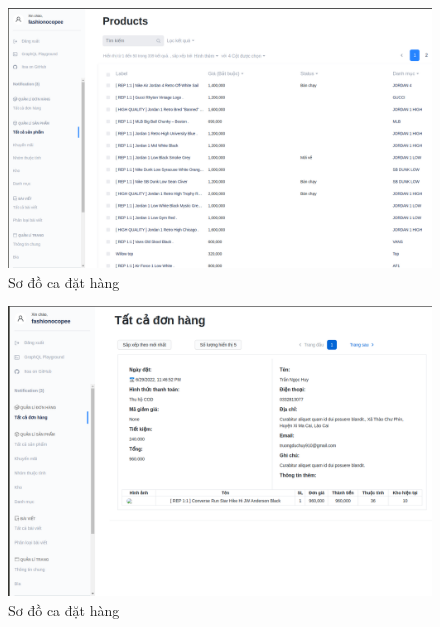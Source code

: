 \begin{figure}[h!]
	\begin{center}	
		\includegraphics[width=\textwidth]{./results/product}
		\caption{Sơ đồ ca đặt hàng}
	\end{center}
\end{figure}
\begin{figure}[h!]
	\begin{center}	
		\includegraphics[width=\textwidth]{./results/order}
		\caption{Sơ đồ ca đặt hàng}
	\end{center}
\end{figure}

